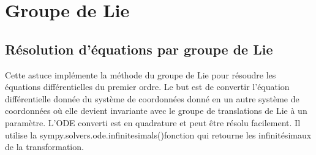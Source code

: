 \chapter{Groupe de Lie}
 \section{Résolution d’équations par groupe de Lie}
  Cette astuce implémente la méthode du groupe de Lie pour résoudre les équations différentielles du premier ordre. Le but est de convertir l'équation différentielle donnée du système de coordonnées donné en un autre système de coordonnées où elle devient invariante avec le groupe de translations de Lie à un paramètre. L'ODE converti est en quadrature et peut être résolu facilement. Il utilise la sympy.solvers.ode.infinitesimals()fonction qui retourne les infinitésimaux de la transformation.
  \begin{python}
   
  \end{python}